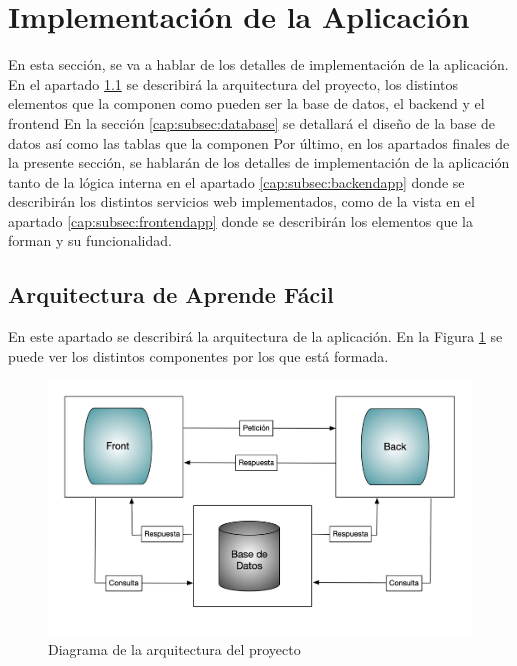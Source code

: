 \section{Implementación de la Aplicación}
\label{cap:sec:implementacionApp}

En esta sección, se va a hablar de los detalles de implementación de la aplicación. En el apartado \ref{cap:subsec:arquitectura} se describirá la arquitectura del proyecto, los distintos elementos que la componen como pueden ser la base de datos, el backend y el frontend En la sección \ref{cap:subsec:database} se detallará el diseño de la base de datos así como las tablas que la componen Por último, en los apartados finales de la presente sección, se hablarán de los detalles de implementación de la aplicación tanto de la lógica interna en el apartado \ref{cap:subsec:backendapp} donde se describirán los distintos servicios web implementados, como de la vista en el apartado \ref{cap:subsec:frontendapp} donde se describirán los elementos que la forman y su funcionalidad.


\subsection{Arquitectura de Aprende Fácil}
\label{cap:subsec:arquitectura}
En este apartado se describirá la arquitectura de la aplicación. En la Figura \ref{fig:diagrama_arquitectura} se puede ver los distintos componentes por los que está formada.

\begin{figure}[!h]
	\includegraphics[width=.9\textwidth]{Imagenes/Bitmap/Capitulo4/DiagramaArquitectura.png}
	\centering
	\caption{Diagrama de la arquitectura del proyecto}
	\label{fig:diagrama_arquitectura}
\end{figure}

